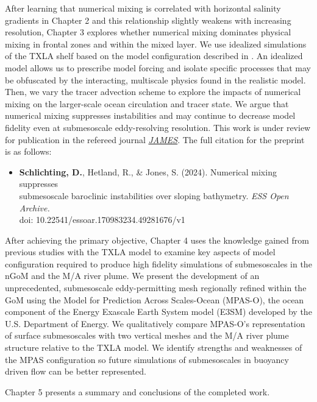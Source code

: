 After learning that numerical mixing is correlated with horizontal salinity gradients in Chapter 2 and this relationship slightly weakens with increasing resolution, Chapter 3 explores whether numerical mixing dominates physical mixing in frontal zones and within the mixed layer. We use idealized simulations of the TXLA shelf based on the model configuration described in \cite{Hetland_2017}. An idealized model allows us to prescribe model forcing and isolate specific processes that may be obfuscated by the interacting, multiscale physics found in the realistic model. Then, we vary the tracer advection scheme to explore the impacts of numerical mixing on the larger-scale ocean circulation and tracer state. We argue that numerical mixing suppresses instabilities and may continue to decrease model fidelity even at submesoscale eddy-resolving resolution. This work is under review for publication in the refereed journal \href{https://essopenarchive.org/users/750365/articles/722044-numerical-mixing-suppresses-submesoscale-baroclinic-instabilities-over-sloping-bathymetry}{\textit{JAMES}}. The full citation for the preprint is as follows:
\begin{itemize}
    \item[] \textbf{Schlichting, D.}, Hetland, R., \& Jones, S. (2024). Numerical mixing suppresses \\
    \hspace{\labelwidth} submesoscale baroclinic instabilities over sloping bathymetry. \textit{ESS Open Archive.}\\ 
        \hspace{\labelwidth} doi: 10.22541/essoar.170983234.49281676/v1
\end{itemize}

After achieving the primary objective, Chapter 4 uses the knowledge gained from previous studies with the TXLA model to examine key aspects of model configuration required to produce high fidelity simulations of submesoscales in the nGoM and the M/A river plume. We present the development of an unprecedented, submesoscale eddy-permitting mesh regionally refined within the GoM using the Model for Prediction Across Scales-Ocean (MPAS-O), the ocean component of the Energy Exascale Earth System model (E3SM) developed by the U.S. Department of Energy. We qualitatively compare MPAS-O's representation of surface submesoscales with two vertical meshes and the M/A river plume structure relative to the TXLA model. We identify strengths and weaknesses of the MPAS configuration so future simulations of submesoscales in buoyancy driven flow can be better represented. 

Chapter 5 presents a summary and conclusions of the completed work. 

